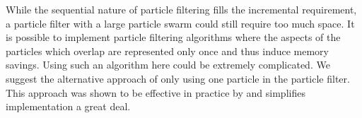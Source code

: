 While the sequential nature of particle filtering fills the incremental requirement, a particle filter with a large particle swarm could still require too much space.  It is possible to implement particle filtering algorithms where the aspects of the particles which overlap are represented only once and thus induce memory savings.  Using such an algorithm here could be extremely complicated.  We suggest the alternative approach of only using one particle in the particle filter.  This approach was shown to be effective in practice by \cite{Gasthaus201} and simplifies implementation a great deal.





